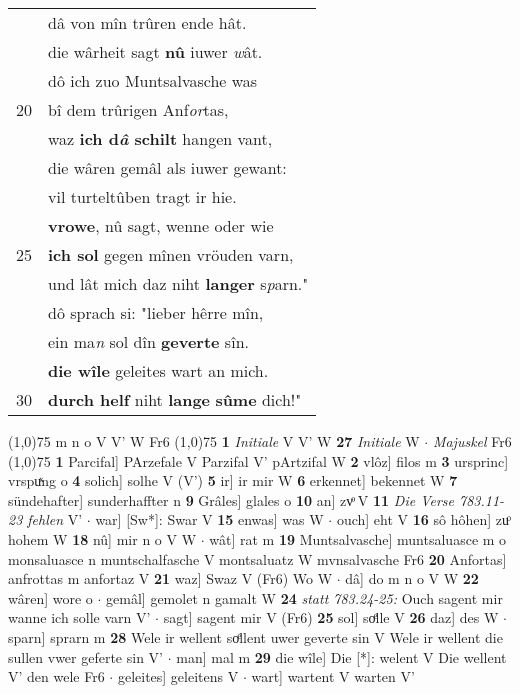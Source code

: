 \documentclass[8pt,a4paper,notitlepage]{article}
\begin{document}
\begin{table}[ht]
\begin{minipage}[t]{0.5\linewidth}
\begin{tabular}{rl}
 & dâ von mîn trûren ende hât.\\ 
 & die wârheit sagt \textbf{nû} iuwer \textit{w}ât.\\ 
 & dô ich zuo Muntsalvasche was\\ 
20 & bî dem trûrigen Anf\textit{or}tas,\\ 
 & waz \textbf{ich d\textit{â} schilt} hangen vant,\\ 
 & die wâren gemâl als iuwer gewant:\\ 
 & vil turteltûben tragt ir hie.\\ 
 & \textbf{vrowe}, nû sagt, wenne oder wie\\ 
25 & \textbf{ich sol} gegen mînen vröuden varn,\\ 
 & und lât mich daz niht \textbf{langer} s\textit{p}arn."\\ 
 & dô sprach si: "lieber hêrre mîn,\\ 
 & ein ma\textit{n} sol dîn \textbf{geverte} sîn.\\ 
 & \textbf{die wîle} geleites wart an mich.\\ 
30 & \textbf{durch helf} niht \textbf{lange} \textbf{sûme} dich!"\\ 
\end{tabular}
\scriptsize
\line(1,0){75} \newline
m n o V V' W Fr6 \newline
\line(1,0){75} \newline
\textbf{1} \textit{Initiale} V V' W  \textbf{27} \textit{Initiale} W   $\cdot$ \textit{Majuskel} Fr6  \newline
\line(1,0){75} \newline
\textbf{1} Parcifal] PArzefale V Parzifal V' pArtzifal W \textbf{2} vlôz] filos m \textbf{3} ursprinc] vrspuͯng o \textbf{4} solich] solhe V (V') \textbf{5} ir] ir mir W \textbf{6} erkennet] bekennet W \textbf{7} sündehafter] sunderhaffter n \textbf{9} Grâles] glales o \textbf{10} an] zvͦ V \textbf{11} \textit{Die Verse 783.11-23 fehlen} V'   $\cdot$ war] [Sw*]: Swar V \textbf{15} enwas] was W  $\cdot$ ouch] eht V \textbf{16} sô hôhen] zuͦ hohem W \textbf{18} nû] mir n o V W  $\cdot$ wât] rat m \textbf{19} Muntsalvasche] muntsaluasce m o monsaluasce n muntschalfasche V montsaluatz W mvnsalvasche Fr6 \textbf{20} Anfortas] anfrottas m anfortaz V \textbf{21} waz] Swaz V (Fr6) Wo W  $\cdot$ dâ] do m n o V W \textbf{22} wâren] wore o  $\cdot$ gemâl] gemolet n gamalt W \textbf{24} \textit{statt 783.24-25:} Ouch sagent mir wanne ich solle varn V'   $\cdot$ sagt] sagent mir V (Fr6) \textbf{25} sol] soͤlle V \textbf{26} daz] des W  $\cdot$ sparn] sprarn m \textbf{28} Wele ir wellent soͤllent uwer geverte sin V Wele ir wellent die sullen vwer geferte sin V'  $\cdot$ man] mal m \textbf{29} die wîle] Die [*]: welent V Die wellent V' den wele Fr6  $\cdot$ geleites] geleitens V  $\cdot$ wart] wartent V warten V' \newline
\end{minipage}
\end{table}
\end{document}

